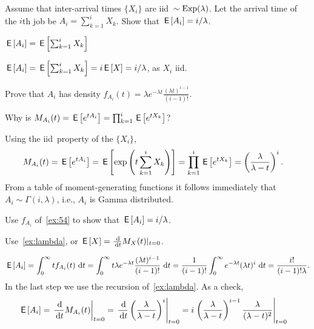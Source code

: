 \begin{exercise}\label{ex:30}
 Assume  that inter-arrival times $\{X_i\}$ are iid\ $\sim\operatorname{Exp}(\lambda)$. Let
the arrival time of the $i$th job be $A_i=\sum_{k=1}^i X_k$. Show that
$\,\mathsf{E}\left[A_i\right] = i/\lambda$.
\begin{hint}
$\,\mathsf{E}\left[A_i\right] = \,\mathsf{E}\left[\sum_{k=1}^i X_k\right]$
\end{hint}
\begin{solution}
$\,\mathsf{E}\left[A_i\right] = \,\mathsf{E}\left[\sum_{k=1}^i X_k\right] = i \,\mathsf{E}\left[X\right] =  i/ \lambda$, as $X_i$ iid.
\end{solution}
\end{exercise}

\begin{exercise}\label{ex:54}
 Prove that $A_i$ has density 
$f_{A_i}(t) = \lambda e^{-\lambda t} \frac{(\lambda t)^{i-1}}{(i-1)!}$.
\begin{hint}
Why is $M_{A_i}(t) = \,\mathsf{E}\left[e^{t A_i}\right] = \prod_{k=1}^{i} \,\mathsf{E}\left[e^{tX_k}\right]$?
\end{hint}
\begin{solution}
 Using the iid\ property of the $\{X_i\}$,
\begin{align*}
 M_{A_i}(t) &= \,\mathsf{E}\left[e^{t A_i}\right] = \,\mathsf{E}\left[\exp\left(t\sum_{k=1}^{i} X_k\right)\right]  = \prod_{k=1}^{i} \,\mathsf{E}\left[e^{tX_k}\right] =
  \left(\frac{\lambda}{\lambda -t }\right)^i.
\end{align*}
From a table of moment-generating functions it follows immediately that
$A_i \sim \Gamma(i,\lambda)$, i.e., $A_i$ is Gamma distributed.
\end{solution}
\end{exercise}

\begin{exercise}
 Use   $f_{A_i}$ of~\cref{ex:54} to show that $\,\mathsf{E}\left[A_i\right]=i/\lambda$.
\begin{hint}
Use~\cref{ex:lambda}, or $\E X = \frac{\d}{\d t} M_X(t) |_{t=0}$.
\end{hint}
\begin{solution}
 \begin{equation*}
\,\mathsf{E}\left[A_i\right] = \int_0^\infty t f_{A_i} (t) \, \,\textrm{d}t =
\int_0^\infty t \lambda e^{-\lambda t} \frac{(\lambda t)^{i-1}}{(i-1)!}\, \,\textrm{d}t = \frac{1}{(i-1)!} \int_0^\infty e^{-\lambda t} (\lambda t)^i\,\,\textrm{d}t = \frac{i!}{(i-1)!\lambda}.
\end{equation*}
In the last step we use the recursion of~\cref{ex:lambda}.
As a check,
\begin{align*}
 \E{A_i}
&= \left.\frac{\d}{\d t} M_{A_i}(t)\right|_{t=0}
= \left.\frac{\d}{\d t} \left(\frac{\lambda}{\lambda-t}\right)^i\right|_{t=0}
= i \left.\left(\frac{\lambda}{\lambda-t}\right)^{i-1}\frac{\lambda}{(\lambda-t)^2}\right|_{t=0}
\end{align*}


\end{solution}
\end{exercise}

